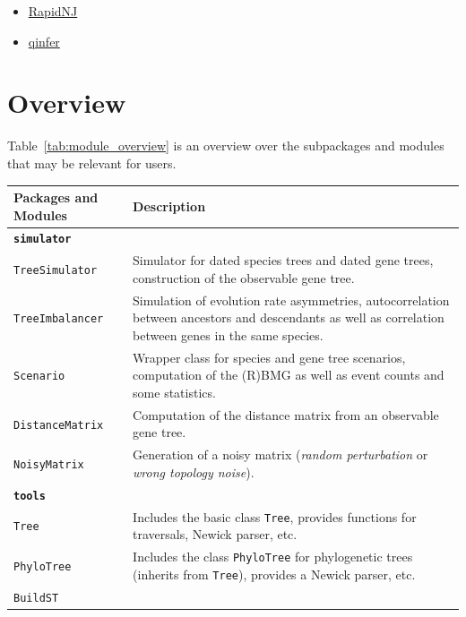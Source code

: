 \documentclass[hidelinks,11pt]{scrreprt}
\begin{document}
\begin{itemize}
	\item \href{https://birc.au.dk/software/rapidnj/}{RapidNJ} \citep{simonsen2008}
	\item \href{https://github.com/david-schaller/qinfer}{qinfer}
\end{itemize}


\section{Overview}

Table~\ref{tab:module_overview} is an overview over the subpackages and modules that may be relevant for users.

\begin{table}[H]
	\footnotesize
	\setlength{\tabcolsep}{6pt}
	\renewcommand{\arraystretch}{1.4}
	\begin{tabularx}{\textwidth}{|p{}|X|}
		\hline
		\textbf{Packages and Modules} & \textbf{Description} \\
		\hline
		\multicolumn{2}{|l|}{\textbf{\texttt{simulator}}}\\
		\hline
		\texttt{TreeSimulator} & 
		Simulator for dated species trees and dated gene trees, construction of the observable gene tree. \\
		\texttt{TreeImbalancer} & 
		Simulation of evolution rate asymmetries, autocorrelation between ancestors and descendants as well as correlation between genes in the same species. \\
		\texttt{Scenario} & 
		Wrapper class for species and gene tree scenarios, computation of the (R)BMG as well as event counts and some statistics. \\
		\texttt{DistanceMatrix} & 
		Computation of the distance matrix from an observable gene tree. \\
		\texttt{NoisyMatrix} & 
		Generation of a noisy matrix (\emph{random perturbation} or \emph{wrong topology noise}). \\
		\hline
		\multicolumn{2}{|l|}{\textbf{\texttt{tools}}}\\
		\hline
		\texttt{Tree} & 
		Includes the basic class \texttt{Tree}, provides functions for traversals, Newick parser, etc. \\
		\texttt{PhyloTree} & 
		Includes the class \texttt{PhyloTree} for phylogenetic trees (inherits from \texttt{Tree}), provides a Newick parser, etc. \\
		\texttt{BuildST} & 

\end{tabularx}
\end{table}
\end{document}
